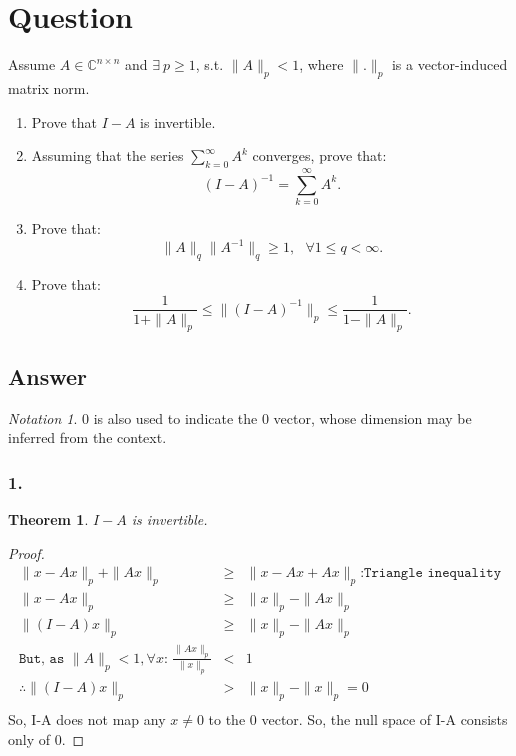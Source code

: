 \documentclass[10pt]{amsart}
\newtheorem{thm}{Theorem}[subsection]
\theoremstyle{remark}
\newtheorem*{notation}{Notation}
\begin{document}
\section{Question}
Assume $A\in \mathbb{C}^{n\times n}$ and $\exists\ p\geq 1$, s.t. $\|A\|_p < 1$, where $\|.\|_p$ is a vector-induced matrix norm.
\begin{enumerate}
\item Prove that $I-A$ is invertible.
\item Assuming that the series $\sum_{k=0}^{\infty}A^k$ converges, prove that:
$$(I-A)^{-1}=\sum_{k=0}^{\infty}A^k.$$
\item Prove that: 
$$\|A\|_q\|A^{-1}\|_q\geq 1,\ \ \  \forall 1\leq q < \infty.$$
\item Prove that:
$$\frac{1}{1+\|A\|_p}\leq \|(I-A)^{-1}\|_p \leq \frac{1}{1-\|A\|_p}.$$
\end{enumerate}
\subsection{Answer}

\begin{notation}
0 is also used to indicate the 0 vector, whose dimension may be inferred from the context.
\end{notation}

\subsubsection{1.}
\begin{thm}
$I-A$ is invertible.
\end{thm}
\begin{proof}
\begin{eqnarray*}
\|x-Ax \|_{p} + \|Ax\|_{p}&\geq& \|x-Ax +Ax\|_{p} \texttt{:Triangle inequality}\\
\|x-Ax \|_{p} &\geq& \|x\|_{p}  - \|Ax\|_{p}\\
\|(I-A)x \|_{p} &\geq& \|x\|_{p}  - \|Ax\|_{p}\\
\texttt{But, as $\|A\|_p < 1, \forall x$: } \frac{\|Ax\|_p}{\|x\|_{p}} &<& 1\\
\therefore \|(I-A)x \|_{p} &>& \|x\|_{p}  - \|x\|_{p} = 0\\
\end{eqnarray*}
So, I-A does not map any $x \neq 0$ to the 0 vector. So, the null space of I-A consists only of 0.
\end{proof}
\end{document}
